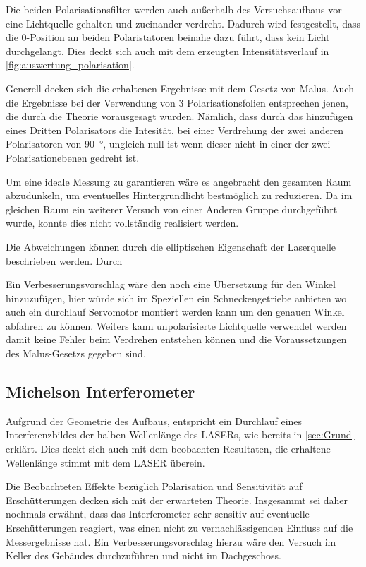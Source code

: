 \documentclass[12pt,english,ngerman]{scrartcl}
\begin{document}
Die beiden Polarisationsfilter werden auch außerhalb des Versuchsaufbaus vor
eine Lichtquelle gehalten und zueinander verdreht. Dadurch wird festgestellt,
dass die 0-Position an beiden Polaristatoren beinahe dazu führt, dass kein
Licht durchgelangt. Dies deckt sich auch mit dem erzeugten Intensitätsverlauf
in \autoref{fig:auswertung_polarisation}.

Generell decken sich die erhaltenen Ergebnisse mit dem Gesetz von Malus. Auch
die Ergebnisse bei der Verwendung von 3 Polarisationsfolien entsprechen jenen,
die durch die Theorie vorausgesagt wurden. Nämlich, dass durch das hinzufügen
eines Dritten Polarisators die Intesität, bei einer Verdrehung der zwei
anderen Polarisatoren von \SI{90}{\degree}, ungleich null ist wenn dieser
nicht in einer der zwei Polarisationebenen gedreht ist.

Um eine ideale Messung zu garantieren wäre es angebracht den gesamten Raum
abzudunkeln, um eventuelles Hintergrundlicht bestmöglich zu reduzieren. Da im
gleichen Raum ein weiterer Versuch von einer Anderen Gruppe durchgeführt wurde,
konnte dies nicht vollständig realisiert werden.

Die Abweichungen können durch die elliptischen Eigenschaft der Laserquelle beschrieben werden.
Durch 


Ein Verbesserungsvorschlag wäre den noch eine Übersetzung für den Winkel hinzuzufügen,
hier würde sich im Speziellen ein Schneckengetriebe anbieten wo auch ein durchlauf Servomotor
montiert werden kann um den genauen Winkel abfahren zu können.
Weiters kann unpolarisierte Lichtquelle verwendet werden damit keine Fehler beim
Verdrehen entstehen können und die Voraussetzungen des Malus-Gesetzs gegeben sind.


\subsection{Michelson Interferometer}

Aufgrund der Geometrie des Aufbaus, entspricht ein Durchlauf eines
Interferenzbildes der halben Wellenlänge des LASERs, wie bereits in
\autoref{sec:Grund} erklärt. Dies deckt sich auch mit dem beobachten
Resultaten, die erhaltene Wellenlänge stimmt mit dem LASER überein.

Die Beobachteten Effekte bezüglich Polarisation und Sensitivität auf
Erschütterungen decken sich mit der erwarteten Theorie. Insgesammt sei daher
nochmals erwähnt, dass das Interferometer sehr sensitiv auf eventuelle
Erschütterungen reagiert, was einen nicht zu vernachlässigenden Einfluss auf
die Messergebnisse hat. Ein Verbesserungsvorschlag hierzu wäre den Versuch im
Keller des Gebäudes durchzuführen und nicht im Dachgeschoss.
\end{document}
